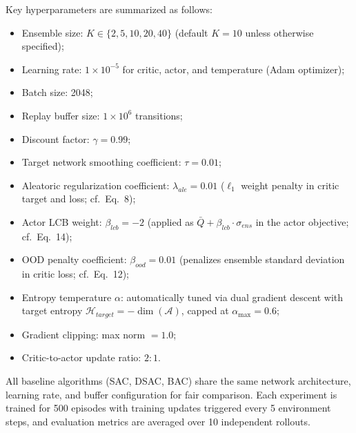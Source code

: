 \documentclass[10pt]{article}
\begin{document}
Key hyperparameters are summarized as follows:
\begin{itemize}
    \item Ensemble size: $K \in \{2, 5, 10, 20, 40\}$ (default $K = 10$ unless otherwise specified);
    \item Learning rate: $1 \times 10^{-5}$ for critic, actor, and temperature (Adam optimizer);
    \item Batch size: 2048;
    \item Replay buffer size: $1 \times 10^6$ transitions;
    \item Discount factor: $\gamma = 0.99$;
    \item Target network smoothing coefficient: $\tau = 0.01$;
    \item Aleatoric regularization coefficient: $\lambda_{ale} = 0.01$ ($\ell_1$ weight penalty in critic target and loss; cf.\ Eq.~8);
    \item Actor LCB weight: $\beta_{lcb} = -2$ (applied as $\bar{Q} + \beta_{lcb} \cdot \sigma_{ens}$ in the actor objective; cf.\ Eq.~14);
    \item OOD penalty coefficient: $\beta_{ood} = 0.01$ (penalizes ensemble standard deviation in critic loss; cf.\ Eq.~12);
    \item Entropy temperature $\alpha$: automatically tuned via dual gradient descent with target entropy $\mathcal{H}_{target} = -\dim(\mathcal{A})$, capped at $\alpha_{\max} = 0.6$;
    \item Gradient clipping: max norm $= 1.0$;
    \item Critic-to-actor update ratio: $2:1$.
\end{itemize}
All baseline algorithms (SAC, DSAC, BAC) share the same network architecture, learning rate, and buffer configuration for fair comparison. Each experiment is trained for 500 episodes with training updates triggered every 5 environment steps, and evaluation metrics are averaged over 10 independent rollouts.
\end{document}
